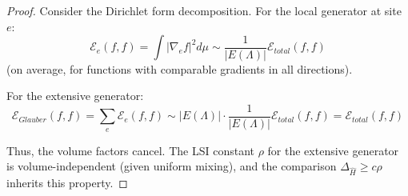 \begin{proof}
Consider the Dirichlet form decomposition. For the local generator at site $e$:
\begin{equation}
\mathcal{E}_e(f,f) = \int |\nabla_e f|^2 d\mu \sim \frac{1}{|E(\Lambda)|} \mathcal{E}_{total}(f,f)
\end{equation}
(on average, for functions with comparable gradients in all directions).

For the extensive generator:
\begin{equation}
\mathcal{E}_{Glauber}(f,f) = \sum_{e} \mathcal{E}_e(f,f) \sim |E(\Lambda)| \cdot \frac{1}{|E(\Lambda)|} \mathcal{E}_{total}(f,f) = \mathcal{E}_{total}(f,f)
\end{equation}

Thus, the volume factors cancel. The LSI constant $\rho$ for the extensive generator is volume-independent (given uniform mixing), and the comparison $\Delta_{\hat{H}} \geq c\rho$ inherits this property.
\end{proof}
